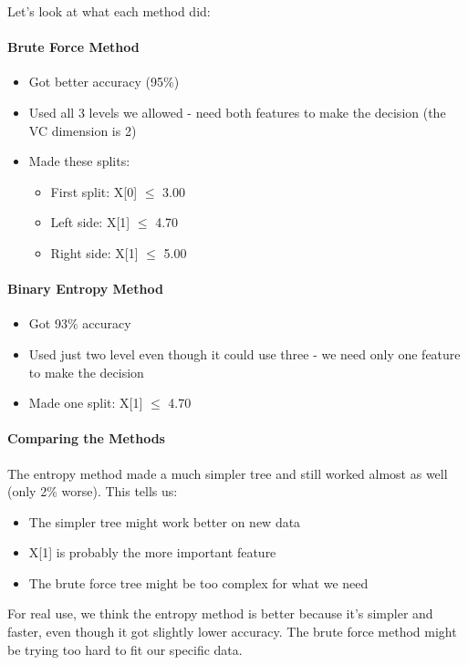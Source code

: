 \documentclass{article}
\begin{document}
Let's look at what each method did:

\paragraph{Brute Force Method}
\begin{itemize}
    \item Got better accuracy (95\%)
    \item Used all 3 levels we allowed - need both features to make the decision (the VC dimension is 2)
    \item Made these splits:
        \begin{itemize}
            \item First split: X[0] $\leq$ 3.00
            \item Left side: X[1] $\leq$ 4.70
            \item Right side: X[1] $\leq$ 5.00
        \end{itemize}
\end{itemize}

\paragraph{Binary Entropy Method}
\begin{itemize}
    \item Got 93\% accuracy
    \item Used just two level even though it could use three - we need only one feature to make the decision
    \item Made one split: X[1] $\leq$ 4.70
\end{itemize}

\paragraph{Comparing the Methods}
The entropy method made a much simpler tree and still worked almost as well (only 2\% worse). This tells us:
\begin{itemize}
    \item The simpler tree might work better on new data
    \item X[1] is probably the more important feature
    \item The brute force tree might be too complex for what we need
\end{itemize}

\noindent For real use, we think the entropy method is better because it's simpler and faster, even though it got slightly lower accuracy. The brute force method might be trying too hard to fit our specific data.
\end{document}
